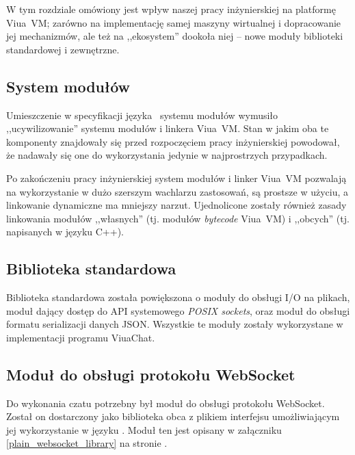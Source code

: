 W tym rozdziale omówiony jest wpływ naszej pracy inżynierskiej na platformę
Viua~VM; zarówno na implementację samej maszyny wirtualnej i dopracowanie jej
mechanizmów, ale też na ,,ekosystem'' dookoła niej -- nowe moduły biblioteki
standardowej i zewnętrzne.

\subsection{System modułów}

Umieszczenie w specyfikacji języka \ViuAct\ systemu modułów wymusiło
,,ucywilizowanie'' systemu modułów i linkera Viua~VM. Stan w jakim oba te
komponenty znajdowały się przed rozpoczęciem pracy inżynierskiej powodował, że
nadawały się one do wykorzystania jedynie w najprostrzych przypadkach.

Po zakończeniu pracy inżynierskiej system modułów i linker Viua~VM pozwalają na
wykorzystanie w dużo szerszym wachlarzu zastosowań, są prostsze w użyciu, a
linkowanie dynamiczne ma mniejszy narzut. Ujednolicone zostały również zasady
linkowania modułów ,,własnych'' (tj. modułów \emph{bytecode} Viua~VM) i
,,obcych'' (tj. napisanych w języku C++).

\subsection{Biblioteka standardowa}

Biblioteka standardowa została powiększona o moduły do obsługi I/O na plikach,
moduł dający dostęp do API systemowego \emph{POSIX sockets}, oraz moduł do
obsługi formatu serializacji danych JSON.
Wszystkie te moduły zostały wykorzystane w implementacji programu ViuaChat.

\subsection{Moduł do obsługi protokołu WebSocket}

Do wykonania czatu potrzebny był moduł do obsługi protokołu WebSocket.
Został on dostarczony jako biblioteka obca z plikiem interfejsu umożliwiającym
jej wykorzystanie w języku \ViuAct. Moduł ten jest opisany w załączniku
\ref{plain_websocket_library} na stronie \pageref{plain_websocket_library}.
